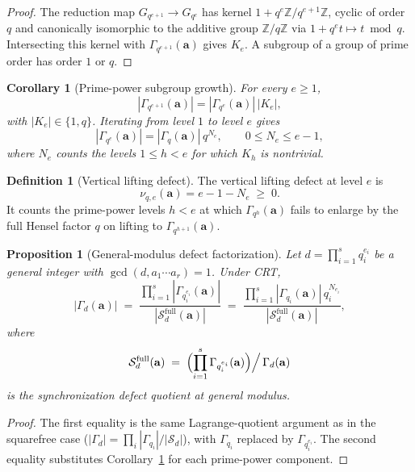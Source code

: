 \documentclass[12pt]{amsart}
\newtheorem{proposition}{Proposition}
\newtheorem{corollary}{Corollary}
\theoremstyle{definition}
\newtheorem{definition}{Definition}
\theoremstyle{remark}
\begin{document}
\begin{proof}
The reduction map $G_{q^{e+1}}\to G_{q^e}$ has kernel
$1+q^e\mathbb Z/q^{e+1}\mathbb Z$, cyclic of order $q$ and canonically isomorphic to the
additive group $\mathbb Z/q\mathbb Z$ via $1+q^e t\mapsto t\bmod q$.  Intersecting this
kernel with $\Gamma_{q^{e+1}}(\mathbf a)$ gives $K_e$.  A subgroup of a group of prime
order has order $1$ or $q$.
\end{proof}

\begin{corollary}[Prime-power subgroup growth]\label{cor:R753-growth}
For every $e\ge 1$,
$$
|\Gamma_{q^{e+1}}(\mathbf a)|=|\Gamma_{q^e}(\mathbf a)|\,|K_e|,
$$
with $|K_e|\in\{1,q\}$.  Iterating from level $1$ to level $e$ gives
$$
|\Gamma_{q^e}(\mathbf a)|=|\Gamma_q(\mathbf a)|\,q^{N_e},
\qquad
0\le N_e\le e-1,
$$
where $N_e$ counts the levels $1\le h<e$ for which $K_h$ is nontrivial.
\end{corollary}

\begin{definition}[Vertical lifting defect]\label{def:vertical-defect}
The vertical lifting defect at level $e$ is
$$
\nu_{q,e}(\mathbf a)=e-1-N_e\;\ge\;0.
$$
It counts the prime-power levels $h<e$ at which $\Gamma_{q^h}(\mathbf a)$ fails to enlarge
by the full Hensel factor $q$ on lifting to $\Gamma_{q^{h+1}}(\mathbf a)$.
\end{definition}

\begin{proposition}[General-modulus defect factorization]\label{prop:R753-general-modulus}
Let $d=\prod_{i=1}^s q_i^{e_i}$ be a general integer with $\gcd(d,a_1\cdots a_r)=1$.  Under
CRT,
$$
|\Gamma_d(\mathbf a)|
\;=\;
\frac{\prod_{i=1}^s|\Gamma_{q_i^{e_i}}(\mathbf a)|}{|\mathcal S_d^{\mathrm{full}}(\mathbf a)|}
\;=\;
\frac{\prod_{i=1}^s|\Gamma_{q_i}(\mathbf a)|\,q_i^{N_{e_i}}}{|\mathcal S_d^{\mathrm{full}}(\mathbf a)|},
$$
where
$$
\mathcal S_d^{\mathrm{full}}(\mathbf a)
\;=\;
\Bigl(\prod_{i=1}^s\Gamma_{q_i^{e_i}}(\mathbf a)\Bigr)\Big/\,\Gamma_d(\mathbf a)
$$
is the synchronization defect quotient at general modulus.
\end{proposition}

\begin{proof}
The first equality is the same Lagrange-quotient argument as in the squarefree case
($|\Gamma_d|=\prod_i|\Gamma_{q_i}|/|\mathcal S_d|$), with $\Gamma_{q_i}$ replaced by
$\Gamma_{q_i^{e_i}}$.  The second equality substitutes Corollary~\ref{cor:R753-growth}
for each prime-power component.
\end{proof}
\end{document}
